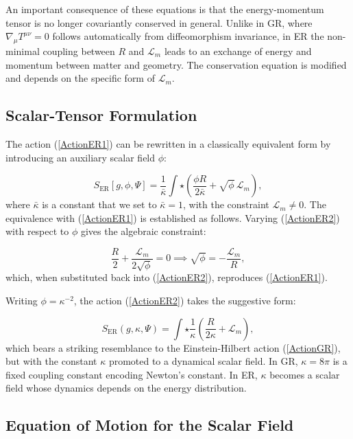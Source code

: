 \documentclass[floats,floatfix,aps, preprintnumbers,nofootinbib]{revtex4-2}
\newcommand{\paren}[1]{\left( #1 \right)}
\newcommand{\mrm}{\mathrm}
\newcommand{\mcal}{\mathcal}
\begin{document}
An important consequence of these equations is that the energy-momentum tensor is no longer covariantly conserved in general. Unlike in GR, where $\nabla_\mu T^{\mu\nu} = 0$ follows automatically from diffeomorphism invariance, in ER the non-minimal coupling between $R$ and $\mcal L_m$ leads to an exchange of energy and momentum between matter and geometry. The conservation equation is modified and depends on the specific form of $\mcal L_m$.

\subsection{Scalar-Tensor Formulation}

The action (\ref{ActionER1}) can be rewritten in a classically equivalent form by introducing an auxiliary scalar field $\phi$:

\begin{equation}\label{ActionER2}
    S_{\mrm{ER}}[g, \phi, \Psi] = \frac{1}{\bar\kappa}\int\star\paren{\frac{\phi R}{2\bar\kappa} + \sqrt\phi\,\mcal L_m},
\end{equation}
where $\bar\kappa$ is a constant that we set to $\bar\kappa = 1$, with the constraint $\mcal L_m \neq 0$. The equivalence with (\ref{ActionER1}) is established as follows. Varying (\ref{ActionER2}) with respect to $\phi$ gives the algebraic constraint:

\begin{equation}
    \frac{R}{2} + \frac{\mcal L_m}{2\sqrt\phi} = 0 \implies \sqrt\phi = -\frac{\mcal L_m}{R},
\end{equation}
which, when substituted back into (\ref{ActionER2}), reproduces (\ref{ActionER1}).

Writing $\phi = \kappa^{-2}$, the action (\ref{ActionER2}) takes the suggestive form:

\begin{equation}
    S_{\mrm{ER}}(g,\kappa,\Psi) = \int\star\frac{1}{\kappa}\paren{\frac{R}{2\kappa} + \mcal L_m},
\end{equation}
which bears a striking resemblance to the Einstein-Hilbert action (\ref{ActionGR}), but with the constant $\kappa$ promoted to a dynamical scalar field. In GR, $\kappa = 8\pi$ is a fixed coupling constant encoding Newton's constant. In ER, $\kappa$ becomes a scalar field whose dynamics depends on the energy distribution.

\subsection{Equation of Motion for the Scalar Field}
\end{document}
